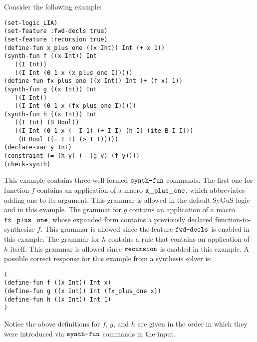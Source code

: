 \documentclass[english,a4paper,10pt]{article}
\begin{document}
\begin{example}
Consider the following example:
\begin{lstlisting}[language=SyGuS]
(set-logic LIA)
(set-feature :fwd-decls true)
(set-feature :recursion true)
(define-fun x_plus_one ((x Int)) Int (+ x 1))
(synth-fun f ((x Int)) Int
   ((I Int))
   ((I Int (0 1 x (x_plus_one I)))))
(define-fun fx_plus_one ((x Int)) Int (+ (f x) 1))
(synth-fun g ((x Int)) Int
   ((I Int))
   ((I Int (0 1 x (fx_plus_one I)))))
(synth-fun h ((x Int)) Int
   ((I Int) (B Bool))
   ((I Int (0 1 x (- I 1) (+ I I) (h I) (ite B I I)))
    (B Bool ((= I I) (> I I)))))
(declare-var y Int)
(constraint (= (h y) (- (g y) (f y))))
(check-synth)
\end{lstlisting}
This example contains three well-formed $\texttt{synth-fun}$ commands.
The first one for function $f$ contains an application of a macro ${\tt x\_plus\_one}$,
which abbreviates adding one to its argument.
This grammar is allowed in the default SyGuS logic
and in this example.
The grammar for $g$ contains an application of a macro ${\tt fx\_plus\_one}$,
whose expanded form contains a previously declared function-to-synthesize $f$.
This grammar is allowed since the feature $\texttt{fwd-decls}$ is enabled in this example.
The grammar for $h$ contains a rule that contains an application of $h$ itself.
This grammar is allowed since $\texttt{recursion}$ is enabled in this example.
A possible correct response for this example from a synthesis solver is:
\begin{lstlisting}[language=SyGuS]
(
(define-fun f ((x Int)) Int x)
(define-fun g ((x Int)) Int (fx_plus_one x))
(define-fun h ((x Int)) Int 1)
)
\end{lstlisting}
Notice the above definitions for $f$, $g$, and $h$ are given 
in the order in which they were introduced via $\texttt{synth-fun}$ commands
in the input.
\end{example}
\end{document}
